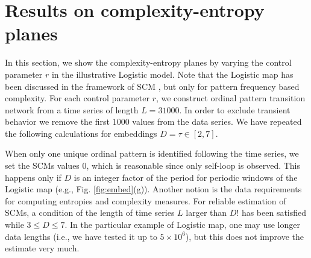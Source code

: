 \documentclass[12pt,aip,cha,reprint,nofootinbib]{revtex4-1}
\begin{document}
\section{Results on complexity-entropy planes} \label{sec:plane}
In this section, we show the complexity-entropy planes by varying the control parameter $r$ in the illustrative Logistic model.  Note that the Logistic map has been discussed in the framework of SCM \cite{RossoPRE2007,MartinPLA2003}, but only for pattern frequency based complexity. For each control parameter $r$, we construct ordinal pattern transition network from a time series of length $L = 31000$. In order to exclude transient behavior we remove the first $1000$ values from the data series. We have repeated the following calculations for embeddings $D = \tau \in [2, 7]$. 

When only one unique ordinal pattern is identified following the time series, we set the SCMs values $0$, which is reasonable since only self-loop is observed. This happens only if $D$ is an integer factor of the period for periodic windows of the Logistic map (e.g., Fig. \ref{fig:embed}(g)).  Another notion is the data requirements for computing entropies and complexity measures. For reliable estimation of SCMs, a condition of the length of time series $L$ larger than $D!$ has been satisfied while $3 \leq D \leq 7$\cite{rossoPRL2007,kowalskiPhyD2007}. In the particular example of Logistic map, one may use longer data lengths (i.e., we have tested it up to $5 \times 10^6$), but this does not improve the estimate very much. 
\end{document}
